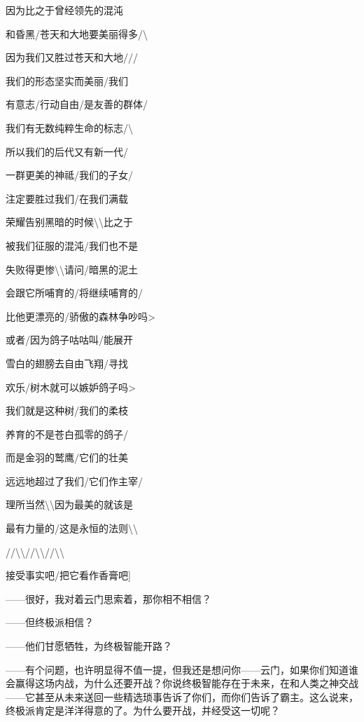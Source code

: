 \documentclass[AutoFakeBold=true]{book}
\begin{document}
{因为比之于曾经领先的混沌

和昏黑/苍天和大地要美丽得多/\textbackslash

因为我们又胜过苍天和大地///

我们的形态坚实而美丽/我们

有意志/行动自由/是友善的群体/

我们有无数纯粹生命的标志/\textbackslash

所以我们的后代又有新一代/

一群更美的神祗/我们的子女/

注定要胜过我们/在我们满载

荣耀告别黑暗的时候\textbackslash\textbackslash 比之于

被我们征服的混沌/我们也不是

失败得更惨\textbackslash\textbackslash 请问/暗黑的泥土

会跟它所哺育的/将继续哺育的/

比他更漂亮的/骄傲的森林争吵吗>

或者/因为鸽子咕咕叫/能展开

雪白的翅膀去自由飞翔/寻找

欢乐/树木就可以嫉妒鸽子吗>

我们就是这种树/我们的柔枝

养育的不是苍白孤零的鸽子/

而是金羽的鹫鹰/它们的壮美

远远地超过了我们/它们作主宰/

理所当然\textbackslash\textbackslash 因为最美的就该是

最有力量的/这是永恒的法则\textbackslash\textbackslash

//\textbackslash\textbackslash//\textbackslash\textbackslash//\textbackslash\textbackslash

接受事实吧/把它看作香膏吧]}

{\kaishu ——很好，}我对着云门思索着，{\kaishu 那你相不相信？}

{\heiti [决不]}

{\kaishu ——但终极派相信？}

{\heiti [对]}

{\kaishu ——他们甘愿牺牲，为终极智能开路？}

{\heiti [对]}

{\kaishu ——有个问题，也许明显得不值一提，但我还是想问你——云门，如果你们知道谁会赢得这场内战，为什么还要开战？你说终极智能存在于未来，在和人类之神交战——它甚至从未来送回一些精选琐事告诉了你们，而你们告诉了霸主。这么说来，终极派肯定是洋洋得意的了。为什么要开战，并经受这一切呢？}
\end{document}

